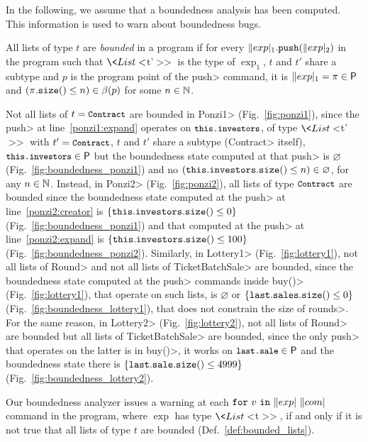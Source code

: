 In the following, we assume that a boundedness analysis has been computed.
This information is used to warn about boundedness bugs.
%
\begin{definition}\label{def:bounded_lists}
  All lists of type $t$ are \emph{bounded} in a program
  if for every $\push{\exp_1}{\exp_2}$ in the program such that
  $\<List<$t'$\texttt{>}>$ is the type of $\exp_1$, 
  $t$ and $t'$ share a subtype and $p$ is the program point
  of the \<push> command,
  it is $\exp_1=\pi\in\paths$ and $({\pi}\mathtt{.size()}\le n)\in\beta(p)$ for some $n\in\mathbb{N}$.
\end{definition}
%
\begin{example}\label{ex:bounded_lists}
  Not all lists of $t=\<Contract>$ are bounded
  in \<Ponzi1> (Fig.~\ref{fig:ponzi1}), since the \<push>
  at line~\ref{ponzi1:expand} operates on $\<this.investors>$, of type
  $\<List<$t'$\texttt{>}>$ with $t'=\<Contract>$, $t$ and $t'$ share a subtype
  (\ieinitial \<Contract> itself), $\<this.investors>\in\paths$
  but the boundedness state computed at that \<push> is
  $\varnothing$ (Fig.~\ref{fig:boundedness_ponzi1}) and no
  $({\mathtt{this.investors}}\mathtt{.size()}\le n)\in\varnothing$, for any $n\in\mathbb{N}$.
  Instead, in \<Ponzi2> (Fig.~\ref{fig:ponzi2}), all lists of type $\<Contract>$
  are bounded since the boundedness state computed at the \<push>
  at line~\ref{ponzi2:creator} is $\{{\mathtt{this.investors}}\mathtt{.size()}\le 0\}$
  (Fig.~\ref{fig:boundedness_ponzi1})
  and that computed at the \<push> at line~\ref{ponzi2:expand} is
  $\{{\mathtt{this.investors}}\mathtt{.size()}\le 100\}$ (Fig.~\ref{fig:boundedness_ponzi2}).
  Similarly, in \<Lottery1> (Fig.~\ref{fig:lottery1}),
  not all lists of \<Round> and not all lists of \<TicketBatchSale> are bounded,
  since the boundedness state computed at the
  \<push> commands inside \<buy()> (Fig.~\ref{fig:lottery1}),
  that operate on such lists, is $\varnothing$ or $\{{\mathtt{last.sales}}\mathtt{.size()}\le 0\}$
  (Fig.~\ref{fig:boundedness_lottery1}), that does not constrain the size of \<rounds>.
  For the same reason, in \<Lottery2> (Fig.~\ref{fig:lottery2}),
  not all lists of \<Round> are bounded but all lists of \<TicketBatchSale>
  are bounded, since the only \<push> that operates on the latter
  is in \<buy()>, it works on $\<last.sale>\in\paths$ and
  the boundedness state there is $\{{\mathtt{last.sale}}\mathtt{.size()}\le 4999\}$
  (Fig.~\ref{fig:boundedness_lottery2}). 
\end{example}
%
\begin{definition}\label{def:warnings}
  Our boundedness analyzer issues a warning at each
  $\for{v}{\exp}{\com}$ command in the program, where
  $\exp$ has type $\<List<$t$\texttt{>}>$, if and only if it is not true that
  all lists of type $t$ are bounded (Def.~\ref{def:bounded_lists}).
\end{definition}
